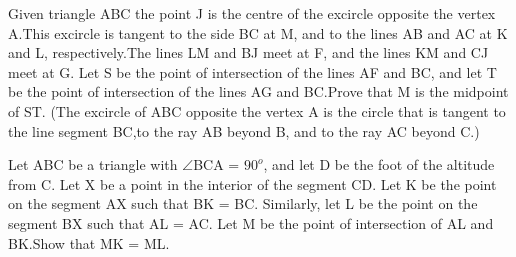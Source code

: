 \item Given triangle ABC the point J is the centre of the excircle opposite the vertex A.This excircle is tangent to the side BC at M, and to the lines AB and AC at K and L, respectively.The lines LM and BJ meet at F, and the lines KM and CJ meet at G. Let S be the point of intersection of the lines AF and BC, and let T be the point of intersection of the lines AG and BC.Prove that M is the midpoint of ST.
(The excircle of ABC opposite the vertex A is the circle that is tangent to the line segment BC,to the ray AB beyond B, and to the ray AC beyond C.)

\item Let ABC be a triangle with $\angle$BCA = $90^{o}$, and let D be the foot of the altitude from C. Let X be a point in the interior of the segment CD. Let K be the point on the segment AX such that BK = BC. Similarly, let L be the point on the segment BX such that AL = AC. Let M be the point of intersection of AL and BK.Show that MK = ML.
